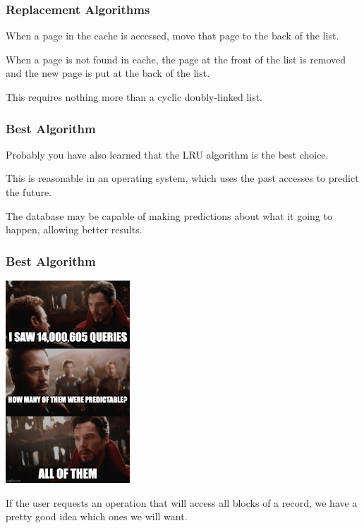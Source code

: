 \begin{frame}
\frametitle{Replacement Algorithms}

When a page in the cache is accessed, move that page to the back of the list. 

When a page is not found in cache, the page at the front of the list is removed and the new page is put at the back of the list. 

This requires nothing more than a cyclic doubly-linked list. 

\end{frame}

\begin{frame}
\frametitle{Best Algorithm}

Probably you have also learned that the LRU algorithm is the best choice. 

This is reasonable in an operating system, which uses the past accesses to predict the future. 

The database may be capable of making predictions about what it going to happen, allowing better results. 

\end{frame}

\begin{frame}
\frametitle{Best Algorithm}



\begin{center}
	\includegraphics[width=0.35\textwidth]{images/predictable.jpg}
\end{center}

If the user requests an operation that will access all blocks of a record, we have a pretty good idea which ones we will want.

\end{frame}

